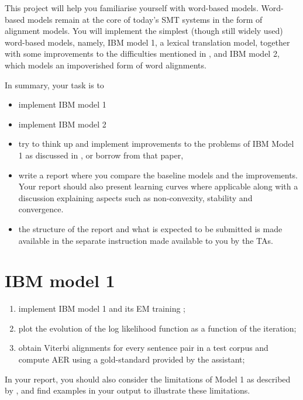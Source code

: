 
This project will help you familiarise yourself with word-based
models.  Word-based models remain at the core of today's SMT systems
in the form of alignment models.
You will implement the simplest (though still widely used) word-based
models, namely, IBM model 1, a lexical translation model, together with
some improvements to the difficulties mentioned in \cite{Moore:2004:IBM1}, 
and IBM model 2, which models an impoverished form of word alignments.

In summary, your task is to

\begin{itemize}
	\item implement IBM model 1
	\item implement IBM model 2
	\item try to think up and implement improvements to the problems 
              of IBM Model 1 as discussed in \cite{Moore:2004:IBM1}, or borrow from that paper,
	\item write a report where you compare the baseline models and the
    improvements. Your report should also present learning curves
    where applicable along with a discussion explaining aspects such
    as non-convexity, stability and convergence.
    \item the structure of the report and what is expected to be submitted is made available in the
      separate instruction made available to you by the TAs.
\end{itemize}

\section{IBM model 1}

\begin{enumerate}
	\item implement IBM model 1 and its EM training \citep{Brown+1993:smt};
	\item plot the evolution of the log likelihood function as a function of the iteration;
	\item obtain Viterbi alignments for every sentence pair in a test corpus and compute 
              AER using a gold-standard provided by the assistant;
\end{enumerate}

In your report, you should also consider the limitations of Model 1
as described by \cite{Moore:2004:IBM1}, and find examples in your
output to illustrate these limitations.

